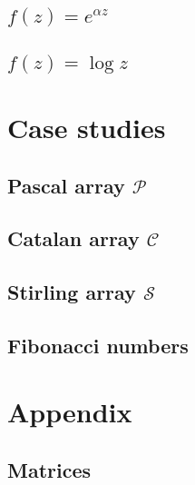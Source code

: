 

\subsection{$f(z)=e^{\alpha z}$}



\subsection{$f(z)=\log{z}$}



\section{Case studies}

\subsection{Pascal array $\mathcal{P}$}



\subsection{Catalan array $\mathcal{C}$}



\subsection{Stirling array $\mathcal{S}$}



\subsection{Fibonacci numbers}



\section{Appendix}




\subsection*{Matrices}





